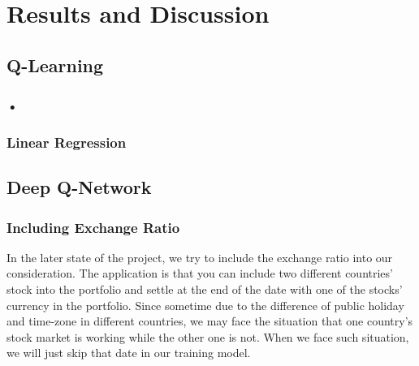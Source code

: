 \chapter{Results and Discussion}
\label{Ch:GivingCredit}

\section{Q-Learning}

\subsection{•}

\subsection{Linear Regression}

\section{Deep Q-Network}

\subsection{Including Exchange Ratio}
In the later state of the project, we try to include the exchange ratio into our consideration. The application is that you can include two different countries' stock into the portfolio and settle at the end of the date with one of the stocks' currency in the portfolio. Since sometime due to the difference of public holiday and time-zone in different countries, we may face the situation that one country's stock market is working while the other one is not. When we face such situation, we will just skip that date in our training model.

\endinput
